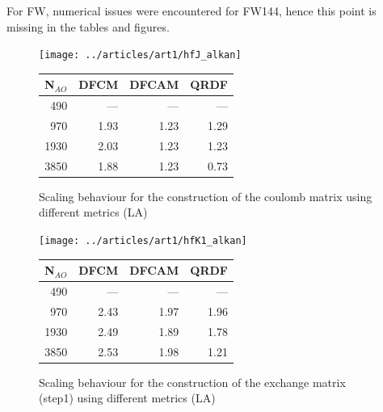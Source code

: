 For FW, numerical issues were encountered for FW144, hence this point is missing in the tables and figures.

\begin{figure}
\begin{minipage}{0.5\textwidth}
\centering
\texttt{[image: ../articles/art1/hfJ\_alkan]}
\end{minipage}
\begin{minipage}{0.4\textwidth}
\centering
\begin{tabular}{rrrr}
\hline
N$_{AO}$ & DFCM & DFCAM & QRDF \\ \hline
490 & --- & --- & --- \\ 
970 & 1.93 & 1.23 & 1.29 \\ 
1930 & 2.03 & 1.23 & 1.23 \\ 
3850 & 1.88 & 1.23 & 0.73 \\ \hline
\end{tabular}
\end{minipage}
\caption{Scaling behaviour for the construction of the coulomb matrix using different metrics (LA)}
\label{fig:GS_DFJSCALE_LA}
\end{figure}
%
\begin{figure}
\begin{minipage}{0.5\textwidth}
\centering
\texttt{[image: ../articles/art1/hfK1\_alkan]}
\end{minipage}
\begin{minipage}{0.4\textwidth}
\centering
\begin{tabular}{rrrr}
\hline
N$_{AO}$ & DFCM & DFCAM & QRDF \\ \hline
490 & --- & --- & --- \\ 
970 & 2.43 & 1.97 & 1.96 \\ 
1930 & 2.49 & 1.89 & 1.78 \\ 
3850 & 2.53 & 1.98 & 1.21 \\ \hline
\end{tabular}
\end{minipage}
\caption{Scaling behaviour for the construction of the exchange matrix (step1) using different metrics (LA)}
\label{fig:GS_DFK1SCALE_LA}
\end{figure}
